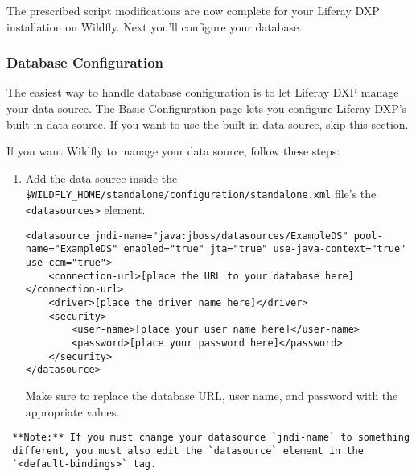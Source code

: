 The prescribed script modifications are now complete for your Liferay
DXP installation on Wildfly. Next you'll configure your database.

\subsubsection{Database Configuration}\label{database-configuration-1}

The easiest way to handle database configuration is to let Liferay DXP
manage your data source. The
\href{/docs/7-1/deploy/-/knowledge_base/d/installing-liferay\#using-the-setup-wizard}{Basic
Configuration} page lets you configure Liferay DXP's built-in data
source. If you want to use the built-in data source, skip this section.

If you want Wildfly to manage your data source, follow these steps:

\begin{enumerate}
\def\labelenumi{\arabic{enumi}.}
\item
  Add the data source inside the
  \texttt{\$WILDFLY\_HOME/standalone/configuration/standalone.xml}
  file's the \texttt{\textless{}datasources\textgreater{}} element.

\begin{verbatim}
<datasource jndi-name="java:jboss/datasources/ExampleDS" pool-name="ExampleDS" enabled="true" jta="true" use-java-context="true" use-ccm="true">
    <connection-url>[place the URL to your database here]</connection-url>
    <driver>[place the driver name here]</driver>
    <security>
        <user-name>[place your user name here]</user-name>
        <password>[place your password here]</password>
    </security>
</datasource>
\end{verbatim}

  Make sure to replace the database URL, user name, and password with
  the appropriate values.
\end{enumerate}

\noindent\hrulefill

\begin{verbatim}
 **Note:** If you must change your datasource `jndi-name` to something
 different, you must also edit the `datasource` element in the
 `<default-bindings>` tag.
\end{verbatim}

\noindent\hrulefill

